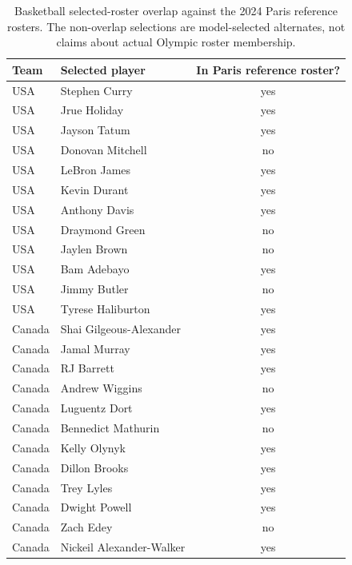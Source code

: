 \documentclass[11pt,letterpaper]{article}
\begin{document}
\begin{table}[h]
  \centering
  \small
  \caption{Basketball selected-roster overlap against the 2024 Paris
    reference rosters. The non-overlap selections are model-selected
    alternates, not claims about actual Olympic roster membership.}
  \begin{tabular}{l l c}
    \toprule
    Team & Selected player & In Paris reference roster? \\
    \midrule
    USA & Stephen Curry & yes \\
    USA & Jrue Holiday & yes \\
    USA & Jayson Tatum & yes \\
    USA & Donovan Mitchell & no \\
    USA & LeBron James & yes \\
    USA & Kevin Durant & yes \\
    USA & Anthony Davis & yes \\
    USA & Draymond Green & no \\
    USA & Jaylen Brown & no \\
    USA & Bam Adebayo & yes \\
    USA & Jimmy Butler & no \\
    USA & Tyrese Haliburton & yes \\
    Canada & Shai Gilgeous-Alexander & yes \\
    Canada & Jamal Murray & yes \\
    Canada & RJ Barrett & yes \\
    Canada & Andrew Wiggins & no \\
    Canada & Luguentz Dort & yes \\
    Canada & Bennedict Mathurin & no \\
    Canada & Kelly Olynyk & yes \\
    Canada & Dillon Brooks & yes \\
    Canada & Trey Lyles & yes \\
    Canada & Dwight Powell & yes \\
    Canada & Zach Edey & no \\
    Canada & Nickeil Alexander-Walker & yes \\
    \bottomrule
  \end{tabular}
\end{table}
\end{document}

